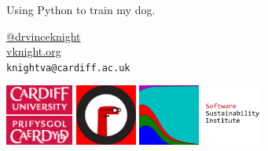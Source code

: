 \documentclass{beamer}
\begin{document}
    \begin{frame}
        \begin{center}
            \Large

            Using Python to train my dog.

            \normalsize
            \vspace{1cm}
            \href{https://twitter.com/drvinceknight}{@drvinceknight}\\
            \url{vknight.org}\\
            \texttt{knightva@cardiff.ac.uk}
        \end{center}


    \end{frame}

    \begin{frame}
        \centering

        \includegraphics[height=2cm]{static/CUident_CMYK.eps}
        \hfill
        \includegraphics[height=2cm]{static/pyconuk.jpg}
        \hfill
        \includegraphics[height=2cm]{static/axelrod_logo.png}
        \hfill
        \includegraphics[height=2cm]{static/ssi-logo.png}
    \end{frame}
\end{document}
